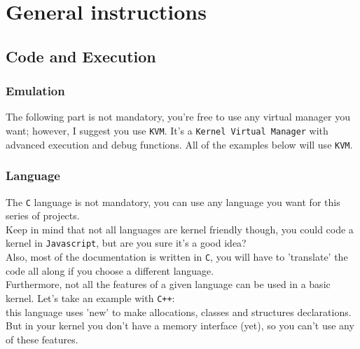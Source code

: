 \documentclass{42-en}
\begin{document}
\chapter{General instructions}
    \section{Code and Execution}
        \subsection{Emulation}
        The following part is not mandatory, you're free to use any virtual
        manager you want; however, I suggest you use \texttt{KVM}.
        It's a \texttt{Kernel Virtual Manager} with advanced execution
        and debug functions.
        All of the examples below will use \texttt{KVM}.
        \subsection{Language}
            The \texttt{C} language is not mandatory, you can use any language
            you want for this series of projects.\\
            Keep in mind that not all languages are kernel friendly though, you
            could code a kernel in \texttt{Javascript}, but are you sure it's a
            good idea?\\
            Also, most of the documentation is written in \texttt{C}, you will
            have to 'translate' the code all along if you choose a different
            language.\\

            Furthermore, not all the features of a given language can be used
            in a basic kernel. Let's take an example with \texttt{C++}:\\
            this language uses 'new' to make allocations, classes and
            structures declarations. But in your kernel you don't have a memory
            interface (yet), so you can't use any of these features.\\
\end{document}
